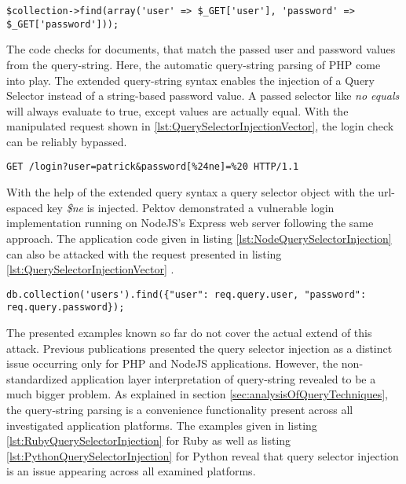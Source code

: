 \begin{lstlisting}[caption={Vulnerable PHP example for query selector injection against MongoDB}, label={lst:PHPQuerySelectorInjection}]
$collection->find(array('user' => $_GET['user'], 'password' => $_GET['password']));
\end{lstlisting}

The code checks for documents, that match the passed user and password values from the query-string. Here, the automatic query-string parsing of PHP come into play. The extended query-string syntax enables the injection of a Query Selector instead of a string-based password value. A passed selector like \emph{no equals} will always evaluate to true, except values are actually equal. With the manipulated request shown in \ref{lst:QuerySelectorInjectionVector}, the login check can be reliably bypassed. \\

\begin{lstlisting}[caption={Attack vector against MongoDB for query selector injection via the query-string parameter}, label={lst:QuerySelectorInjectionVector}]
GET /login?user=patrick&password[%24ne]=%20 HTTP/1.1
\end{lstlisting}

With the help of the extended query syntax a query selector object with the url-espaced key \emph{\$ne} is injected. Pektov \cite{Petkov:2014a} demonstrated a vulnerable login implementation running on NodeJS's Express web server following the same approach. The application code given in listing \ref{lst:NodeQuerySelectorInjection} can also be attacked with the request presented in listing \ref{lst:QuerySelectorInjectionVector} . \\

\begin{lstlisting}[caption={Vulnerable NodeJS example for query selector injection against MongoDB}, label={lst:NodeQuerySelectorInjection}]
db.collection('users').find({"user": req.query.user, "password": req.query.password});
\end{lstlisting}

The presented examples known so far do not cover the actual extend of this attack. Previous publications presented the query selector injection as a distinct issue occurring only for PHP and NodeJS applications. However, the non-standardized application layer interpretation of query-string revealed to be a much bigger problem. As explained in section \ref{sec:analysisOfQueryTechniques}, the query-string parsing is a convenience functionality present across all investigated application platforms. The examples given in listing \ref{lst:RubyQuerySelectorInjection} for Ruby as well as listing \ref{lst:PythonQuerySelectorInjection} for Python reveal that query selector injection is an issue appearing across all examined platforms. \\

